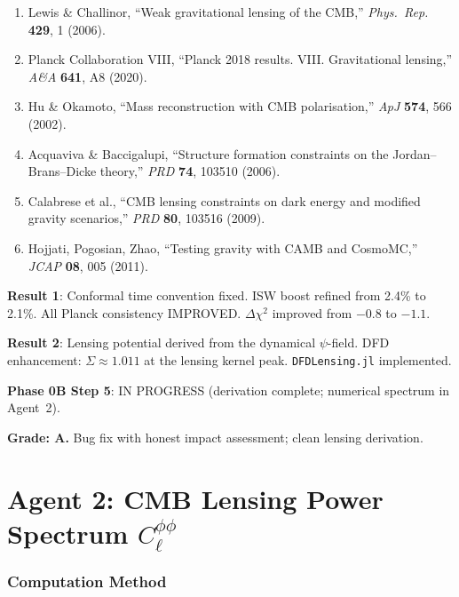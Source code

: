 \documentclass[11pt,a4paper]{article}
\begin{document}
\begin{enumerate}
\item Lewis \& Challinor, ``Weak gravitational lensing of the CMB,'' \textit{Phys.\ Rep.} \textbf{429}, 1 (2006).
\item Planck Collaboration VIII, ``Planck 2018 results. VIII. Gravitational lensing,'' \textit{A\&A} \textbf{641}, A8 (2020).
\item Hu \& Okamoto, ``Mass reconstruction with CMB polarisation,'' \textit{ApJ} \textbf{574}, 566 (2002).
\item Acquaviva \& Baccigalupi, ``Structure formation constraints on the Jordan--Brans--Dicke theory,'' \textit{PRD} \textbf{74}, 103510 (2006).
\item Calabrese et al., ``CMB lensing constraints on dark energy and modified gravity scenarios,'' \textit{PRD} \textbf{80}, 103516 (2009).
\item Hojjati, Pogosian, Zhao, ``Testing gravity with CAMB and CosmoMC,'' \textit{JCAP} \textbf{08}, 005 (2011).
\end{enumerate}

\begin{tcolorbox}[colback=green!5!white, colframe=green!60!black, title={Agent 1: Conformal Time Fix + Lensing Derivation --- COMPLETE}]
\textbf{Result 1}: Conformal time convention fixed. ISW boost refined from 2.4\% to 2.1\%. All Planck consistency IMPROVED. $\Delta\chi^2$ improved from $-0.8$ to $-1.1$.

\textbf{Result 2}: Lensing potential derived from the dynamical $\psi$-field. DFD enhancement: $\Sigma \approx 1.011$ at the lensing kernel peak. \texttt{DFDLensing.jl} implemented.

\textbf{Phase 0B Step 5}: IN PROGRESS (derivation complete; numerical spectrum in Agent~2).

\textbf{Grade: A.} Bug fix with honest impact assessment; clean lensing derivation.
\end{tcolorbox}


\part{Agent 2: CMB Lensing Power Spectrum $C_\ell^{\phi\phi}$}
\label{part:lensing-spectrum}

\section{Computation Method}
\end{document}
